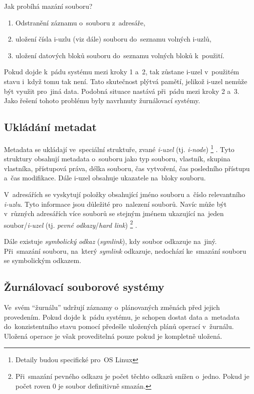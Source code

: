 Jak probíhá mazání souboru?

\begin{enumerate}
	\item Odstranění záznamu o~souboru z~adresáře,
	\item uložení čísla i-uzlu (viz dále) souboru do~seznamu volných i-uzlů,
	\item uložení datových bloků souboru do~seznamu volných bloků k~použití.
\end{enumerate}

Pokud dojde k~pádu systému mezi kroky 1 a~2, tak zůstane i-uzel v~použitém stavu i~když tomu tak není. Tato skutečnost plýtvá pamětí, jelikož i-uzel nemůže být využit pro~jiná data. Podobná situace nastává při~pádu mezi kroky 2 a~3. Jako řešení tohoto problému byly navrhnuty žurnálovací systémy.

\subsection{Ukládání metadat}

Metadata se ukládají ve~speciální struktuře, zvané \emph{i-uzel} (tj. \emph{i-node})%
\footnote{Detaily budou specifické pro~OS Linux} %
. Tyto struktury obsahují metadata o~souboru jako typ souboru, vlastník, skupina vlastníka, přístupová práva, délka souboru, čas vytvoření, čas posledního přístupu a~čas modifikace. Dále i-uzel obsahuje ukazatele na~bloky souboru.

V~adresářích se vyskytují položky obsahující jméno souboru a~číslo relevantního \emph{i-uzlu}. Tyto informace jsou důležité pro~nalezení souborů. Navíc může být v~různých adresářích více souborů se stejným jménem ukazující na~jeden soubor/\emph{i-uzel} (tj. \emph{pevné odkazy}/\emph{hard link})%
\footnote{Při~smazání pevného odkazu je počet těchto odkazů snížen o~jedno. Pokud je počet roven 0 je soubor definitivně smazán.}%
.

Dále existuje \emph{symbolický odkaz} (\emph{symlink}), kdy soubor odkazuje na~jiný. Při~smazání souboru, na~který \emph{symlink} odkazuje, nedochází ke~smazání souboru se symbolickým odkazem.

\subsection{Žurnálovací souborové systémy}

Ve~svém \enquote{žurnálu} udržují záznamy o~plánovaných změnách před jejich provedením. Pokud dojde k~pádu systému, je schopen dostat data a~metadata do~konzistentního stavu pomocí předešle uložených plánů operací v~žurnálu. Uložená operace je však proveditelná pouze pokud je kompletně uložená.

